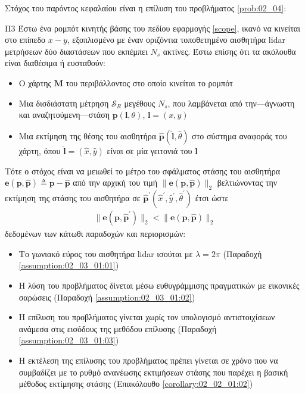 Στόχος του παρόντος κεφαλαίου είναι η επίλυση του προβλήματος \ref{prob:02_04}:

\begin{bw_box}
\begin{customproblem}{Π3}
  \label{prob:02_04}
  Έστω ένα ρομπότ κινητής βάσης του πεδίου εφαρμογής \ref{scope}, ικανό να
  κινείται στο επίπεδο $x-y$, εξοπλισμένο με έναν οριζόντια τοποθετημένο
  αισθητήρα lidar μετρήσεων δύο διαστάσεων που εκπέμπει $N_s$ ακτίνες. Έστω
  επίσης ότι τα ακόλουθα είναι διαθέσιμα ή ευσταθούν:
  \begin{itemize}
    \item Ο χάρτης $\bm{M}$ του περιβάλλοντος στο οποίο κινείται το ρομπότ
    \item Μια δισδιάστατη μέτρηση $\mathcal{S}_R$ μεγέθους $N_s$, που λαμβάνεται
          από την---άγνωστη και αναζητούμενη---στάση $\bm{p}(\bm{l},\theta)$,
          $\bm{l} = (x,y)$
    \item Μια εκτίμηση της θέσης του αισθητήρα
          $\hat{\bm{p}}(\hat{\bm{l}}, \hat{\theta})$ στο σύστημα αναφοράς του
          χάρτη, όπου $\hat{\bm{l}} = (\hat{x}, \hat{y})$ είναι σε μία γειτονιά
          του $\bm{l}$
  \end{itemize}
\end{customproblem}
Τότε ο στόχος είναι να μειωθεί το μέτρο του σφάλματος στάσης του αισθητήρα
$\bm{e}(\bm{p}, \hat{\bm{p}}) \triangleq \bm{p}- \hat{\bm{p}}$ από την αρχική
του τιμή $\|\bm{e}(\bm{p}, \hat{\bm{p}})\|_2$
βελτιώνοντας την εκτίμηση της στάσης του αισθητήρα σε
$\hat{\bm{p}}^\prime(\hat{x}^\prime, \hat{y}^\prime, \hat{\theta}^\prime)$
έτσι ώστε
\begin{align}
  \|\bm{e}(\bm{p}, \hat{\bm{p}}^\prime)\|_2 < \|\bm{e}(\bm{p}, \hat{\bm{p}})\|_2
  \tag{$\astt$}
  \label{objective:02_04}
\end{align}
δεδομένων των κάτωθι παραδοχών και περιορισμών:
\begin{itemize}
  \item Το γωνιακό εύρος του αισθητήρα lidar ισούται με $\lambda = 2\pi$
        (Παραδοχή \ref{assumption:02_03_01:01})
  \item Η λύση του προβλήματος δίνεται μέσω ευθυγράμμισης πραγματικών με εικονικές
        σαρώσεις (Παραδοχή \ref{assumption:02_03_01:02})
  \item Η επίλυση του προβλήματος γίνεται χωρίς τον υπολογισμό αντιστοιχίσεων
        ανάμεσα στις εισόδους της μεθόδου επίλυσης (Παραδοχή
        \ref{assumption:02_03_01:03})
  \item Η εκτέλεση της επίλυσης του προβλήματος πρέπει γίνεται σε χρόνο που να
        συμβαδίζει με το ρυθμό ανανέωσης εκτιμήσεων στάσης που παρέχει η βασική
        μέθοδος εκτίμησης στάσης (Επακόλουθο \ref{corollary:02_02_01:02})
\end{itemize}

\end{bw_box}


